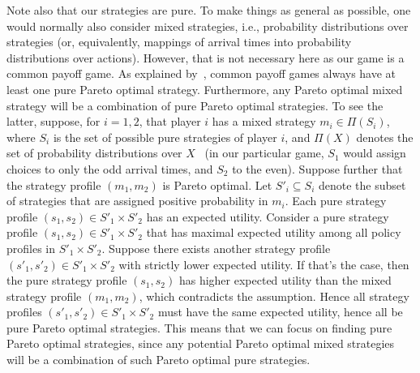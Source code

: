 \documentclass[twocolumn,a4paper,superscriptaddress,nofootinbib]{revtex4}
\begin{document}
Note also that our strategies are pure. To make things as general as possible, one would normally also consider mixed strategies, i.e., probability distributions over strategies (or, equivalently, mappings of arrival times into probability distributions over actions).  However, that is not necessary here as our game is a common payoff game. As explained by~\citet{leyton2022essentials}, common payoff games always have at least one pure Pareto optimal strategy. Furthermore, any Pareto optimal mixed strategy will be a combination of pure Pareto optimal strategies. 
To see the latter, suppose, for $i=1,2$, that player $i$ has a mixed strategy $m_i \in \Pi(S_i)$, where $S_i$ is the set of possible pure strategies of player $i$, and $\Pi(X)$ denotes the set of probability distributions over $X$~\citep{shoham2008multiagent} (in our particular game, $S_1$ would assign choices to only the odd arrival times, and $S_2$ to the even). Suppose further that the strategy profile $(m_1,m_2)$ is Pareto optimal. Let $S'_i \subseteq S_i$ denote the subset of strategies that are assigned positive probability in $m_i$. 
Each pure strategy profile $(s_1,s_2) \in S'_1 \times S'_2$ has an expected utility. Consider a pure strategy profile $(s_1,s_2) \in S'_1 \times S'_2$ that has maximal expected utility among all policy profiles in $S'_1 \times S'_2$. Suppose there exists another strategy profile $(s'_1,s'_2) \in S'_1 \times S'_2$ with strictly lower expected utility. If that's the case, then the pure strategy profile $(s_1,s_2)$ has higher expected utility than the mixed strategy profile $(m_1,m_2)$, which contradicts the assumption. Hence all strategy profiles $(s'_1,s'_2) \in S'_1 \times S'_2$ must have the same expected utility, hence all be pure Pareto optimal strategies. This means that we can focus on finding pure Pareto optimal strategies, since any potential Pareto optimal mixed strategies will be a combination of such Pareto optimal pure strategies.   
\end{document}
